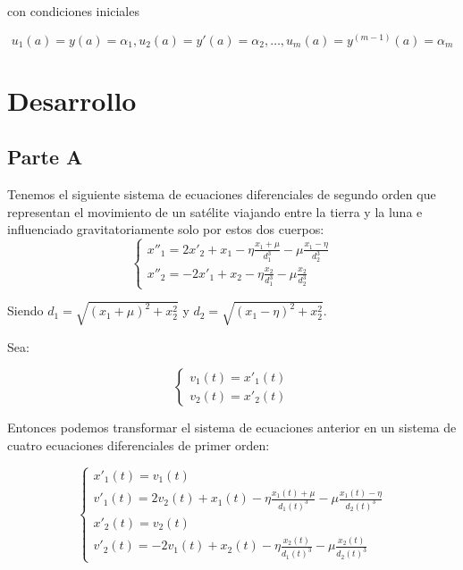 \documentclass[titlepage,a4paper]{article}
\begin{document}
			con condiciones iniciales

			\begin{equation}
				u_{1}(a)=y(a)=\alpha_{1}, u_{2}(a)=y'(a)=\alpha_{2},\dots,u_{m}(a)=y^{(m-1)}(a)=\alpha_{m}
			\end{equation}
\section{Desarrollo}\label{sec:desarrollo}
	\subsection{Parte A}\label{sec:parteA}

		Tenemos el siguiente sistema de ecuaciones diferenciales de segundo orden que representan el movimiento de un satélite
		viajando entre la tierra y la luna e influenciado gravitatoriamente solo por estos dos cuerpos:
		\begin{equation}
			\begin{cases}
				x''_{1} = 2x'_{2} + x_{1} - \eta\frac{x_{1} + \mu}{d_{1}^{3}} - \mu\frac{x_{1}-\eta}{d_{2}^{3}}\\
				x''_{2} = -2x'_{1} + x_{2} - \eta\frac{x_{2}}{d_{1}^{3}} - \mu\frac{x_{2}}{d_{2}^{3}}
			\end{cases}
		\end{equation}

		Siendo $d_{1}=\sqrt{(x_{1}+\mu)^{2} + x_{2}^{2}}$ y $d_{2}=\sqrt{(x_{1}-\eta)^{2} + x_{2}^{2}}$.

		Sea:

		\begin{equation}
			\begin{cases}
				v_{1}(t) = x'_{1}(t)\\
				v_{2}(t) = x'_{2}(t)
			\end{cases}
		\end{equation}

		Entonces podemos transformar el sistema de ecuaciones anterior en un sistema de cuatro ecuaciones 
		diferenciales de primer orden:

		\begin{equation}
			\begin{cases}
				x'_{1}(t) = v_{1}(t)\\
				v'_{1}(t) = 2v_{2}(t) + x_{1}(t) - \eta\frac{x_{1}(t) + \mu}{d_{1}(t)^{3}} - \mu\frac{x_{1}(t) - \eta}{d_{2}(t)^{3}}\\
				x'_{2}(t) = v_{2}(t)\\				
				v'_{2}(t) = -2v_{1}(t) + x_{2}(t) - \eta\frac{x_{2}(t)}{d_{1}(t)^{3}} - \mu\frac{x_{2}(t)}{d_{2}(t)^{3}}
			\end{cases}
		\end{equation}
\end{document}

